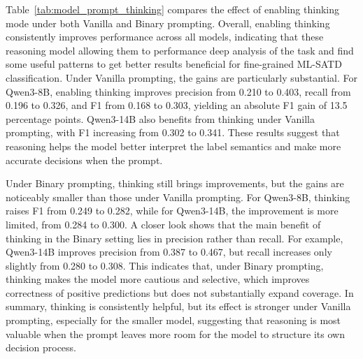 \documentclass[acmsmall,screen,review,anonymous]{acmart}
\begin{document}
Table~\ref{tab:model_prompt_thinking} compares the effect of enabling thinking mode under both Vanilla and Binary prompting. Overall, enabling thinking consistently improves performance across all models, indicating that these reasoning model allowing them to performance deep analysis of the task and find some useful patterns to get better results beneficial for fine-grained ML-SATD classification. Under Vanilla prompting, the gains are particularly substantial. For Qwen3-8B, enabling thinking improves precision from 0.210 to 0.403, recall from 0.196 to 0.326, and F1 from 0.168 to 0.303, yielding an absolute F1 gain of 13.5 percentage points. Qwen3-14B also benefits from thinking under Vanilla prompting, with F1 increasing from 0.302 to 0.341. These results suggest that reasoning helps the model better interpret the label semantics and make more accurate decisions when the prompt.

Under Binary prompting, thinking still brings improvements, but the gains are noticeably smaller than those under Vanilla prompting. For Qwen3-8B, thinking raises F1 from 0.249 to 0.282, while for Qwen3-14B, the improvement is more limited, from 0.284 to 0.300. A closer look shows that the main benefit of thinking in the Binary setting lies in precision rather than recall. For example, Qwen3-14B improves precision from 0.387 to 0.467, but recall increases only slightly from 0.280 to 0.308. This indicates that, under Binary prompting, thinking makes the model more cautious and selective, which improves correctness of positive predictions but does not substantially expand coverage. In summary, thinking is consistently helpful, but its effect is stronger under Vanilla prompting, especially for the smaller model, suggesting that reasoning is most valuable when the prompt leaves more room for the model to structure its own decision process.








\end{document}
